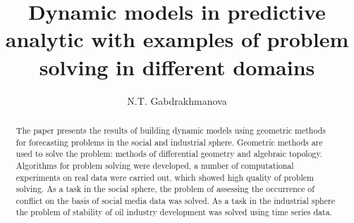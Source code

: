 \begin{englishtitle} %
\title{Dynamic models in predictive analytic with examples of problem solving in different domains}
\author{N.T. Gabdrakhmanova
}

\maketitle

\begin{abstract}
 The paper presents the results of building dynamic models using geometric methods for forecasting problems in the social and industrial sphere. Geometric methods are used to solve the problem: methods of differential geometry and algebraic topology. Algorithms for problem solving were developed, a number of computational experiments on real data were carried out, which showed high quality of problem solving. As a task in the social sphere, the problem of assessing the occurrence of conflict on the basis of social media data was solved. As a task in the industrial sphere the problem of stability of oil industry development was solved using time series data. 

\end{abstract}
\end{englishtitle}


\iffalse
%
%


\documentclass[12pt]{llncs}  


\usepackage{iftex}

\ifPDFTeX
\usepackage[T2A]{fontenc}
\usepackage[utf8]{inputenc} %
\usepackage[english,russian]{babel}
\fi

